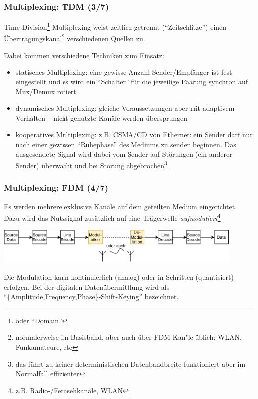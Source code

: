 \documentclass[ignorenonframetext]{beamer}
\begin{document}
\begin{frame}
\frametitle{Multiplexing: TDM (3/7)}
Time-Division\footnote{oder ``Domain''} Multiplexing weist zeitlich getrennt (``Zeitschlitze'') einen \"Ubertragungskanal\footnote{normalerweise im Basisband, aber auch \"uber FDM-Kan\a"le \"ublich: WLAN, Funkamateure, etc} verschiedenen Quellen zu. 

Dabei kommen verschiedene Techniken zum Einsatz:
\begin{itemize}
  \item statisches Multiplexing: eine gewisse Anzahl Sender/Empf\"anger ist fest eingestellt und es wird ein ``Schalter'' f\"ur die jeweilige Paarung synchron auf Mux/Demux rotiert
  \item dynamisches Multiplexing: gleiche Voraussetzungen aber mit adaptivem Verhalten -- nicht genutzte Kan\"ale werden \"ubersprungen
  \item kooperatives Multiplexing: z.B. CSMA/CD von Ethernet: ein Sender darf nur nach einer gewissen ``Ruhephase'' des Mediums zu senden beginnen. Das ausgesendete Signal wird dabei vom Sender auf St\"orungen (ein anderer Sender) \"uberwacht und bei St\"orung abgebrochen\footnote{das f\"uhrt zu keiner deterministischen Datenbandbreite funktioniert aber im Normalfall effizienter}
\end{itemize}
\end{frame}







\begin{frame}
\frametitle{Multiplexing: FDM (4/7)}
Es werden mehrere exklusive Kan\"ale auf dem geteilten Medium eingerichtet. Dazu wird das Nutzsignal zus\"atzlich auf eine Tr\"agerwelle \emph{aufmoduliert}\footnote{z.B. Radio-/Fernsehkan\"ale, WLAN}
\vspace{0.5cm}

\includegraphics[width=12cm]{broadband-circuit}
\begin{block}{}
Die Modulation kann kontinuierlich (analog) oder in Schritten (quantisiert) erfolgen. Bei der digitalen Daten\"ubermittlung wird als ``\{Amplitude,Frequency,Phase\}-Shift-Keying'' bezeichnet.
\end{block}
\end{frame}
\end{document}
